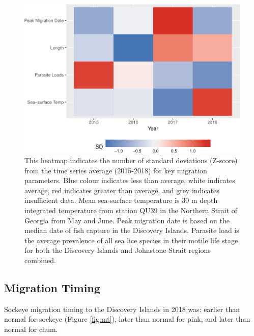 \documentclass[fleqn,10pt]{wlpeerj} %
\begin{document}
\begin{figure}
\includegraphics[width=0.8\linewidth]{peer_j_migration_dynamics_files/figure-latex/heatmap-1} \caption{This heatmap indicates the number of standard deviations (Z-score) from the time series average (2015-2018) for key migration parameters. Blue colour indicates less than average, white indicates average, red indicates greater than average, and grey indicates insufficient data. Mean sea-surface temperature is 30 m depth integrated temperature from station QU39 in the Northern Strait of Georgia from May and June. Peak migration date is based on the median date of fish capture in the Discovery Islands. Parasite load is the average prevalence of all sea lice species in their motile life stage for both the Discovery Islands and Johnstone Strait regions combined.}\label{fig:heatmap}
\end{figure}

\subsection*{Migration Timing}\label{migration-timing}

Sockeye migration timing to the Discovery Islands in 2018 was: earlier
than normal for sockeye (Figure \ref{fig:mt}), later than normal for
pink, and later than normal for chum.
\end{document}
